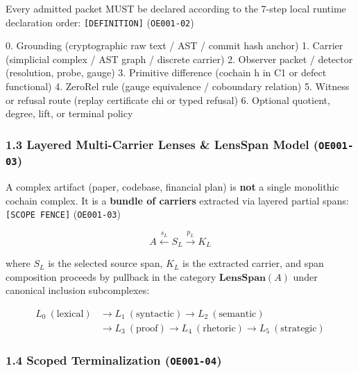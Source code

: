 \documentclass[
  11pt,
]{article}
\newenvironment{Shaded}{}{}
\newcommand{\NormalTok}[1]{#1}
\renewcommand{\_}{\origunderscore\allowbreak}
\begin{document}
Every admitted packet MUST be declared according to the 7-step local
runtime declaration order: \texttt{{[}DEFINITION{]}} (\texttt{OE001-02})

\begin{Shaded}
\begin{Highlighting}[]
\NormalTok{0. Grounding (cryptographic raw text / AST / commit hash anchor)}
\NormalTok{1. Carrier (simplicial complex / AST graph / discrete carrier)}
\NormalTok{2. Observer packet / detector (resolution, probe, gauge)}
\NormalTok{3. Primitive difference (cochain h in C1 or defect functional)}
\NormalTok{4. ZeroRel rule (gauge equivalence / coboundary relation)}
\NormalTok{5. Witness or refusal route (replay certificate chi or typed refusal)}
\NormalTok{6. Optional quotient, degree, lift, or terminal policy}
\end{Highlighting}
\end{Shaded}

\subsubsection{\texorpdfstring{1.3 Layered Multi-Carrier Lenses \&
LensSpan Model
(\texttt{OE001-03})}{1.3 Layered Multi-Carrier Lenses \& LensSpan Model (OE001-03)}}\label{layered-multi-carrier-lenses-lensspan-model-oe001-03}

A complex artifact (paper, codebase, financial plan) is \textbf{not} a
single monolithic cochain complex. It is a \textbf{bundle of carriers}
extracted via layered partial spans: \texttt{{[}SCOPE\ FENCE{]}}
(\texttt{OE001-03})

\[A \xleftarrow{s_L} S_L \xrightarrow{p_L} K_L\]

where \(S_L\) is the selected source span, \(K_L\) is the extracted
carrier, and span composition proceeds by pullback in the category
\(\mathbf{LensSpan}(A)\) under canonical inclusion subcomplexes:

\[\begin{aligned}
L_0 \ (\text{lexical}) &\longrightarrow L_1 \ (\text{syntactic}) \longrightarrow L_2 \ (\text{semantic}) \\
&\longrightarrow L_3 \ (\text{proof}) \longrightarrow L_4 \ (\text{rhetoric}) \longrightarrow L_5 \ (\text{strategic})
\end{aligned}\]

\subsubsection{\texorpdfstring{1.4 Scoped Terminalization
(\texttt{OE001-04})}{1.4 Scoped Terminalization (OE001-04)}}\label{scoped-terminalization-oe001-04}
\end{document}
